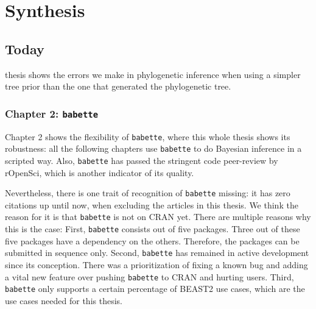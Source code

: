 \chapter{Synthesis}
\label{synthesis}

\newpage



\section{Today}

\noindent 
{} thesis shows the errors we make in phylogenetic inference
when using a simpler tree prior than the one that generated the phylogenetic
tree.

\subsection{Chapter 2: \texttt{babette}}

Chapter 2 shows the flexibility of \verb;babette;, where this whole thesis
shows its robustness: all the following chapters use \verb;babette; to
do Bayesian inference in a scripted way. Also, \verb;babette; has passed
the stringent code peer-review by rOpenSci, which is another indicator of 
its quality.

Nevertheless, there is one trait of recognition of \verb;babette; missing:
it has zero citations up until now, when excluding the articles in this 
thesis. We think the reason for it is that \verb;babette; is
not on CRAN yet. There are multiple reasons why this is the case:
First, \verb;babette; consists out of five packages. Three out of these
five packages have a dependency on the others. Therefore, the packages can
be submitted in sequence only. Second, \verb;babette; has remained in active 
development since its conception. There was a prioritization of 
fixing a known bug and adding a vital new feature over 
pushing \verb;babette; to CRAN and hurting users. Third, \verb;babette;
only supports a certain percentage of BEAST2 use cases, which are the
use cases needed for this thesis. 

